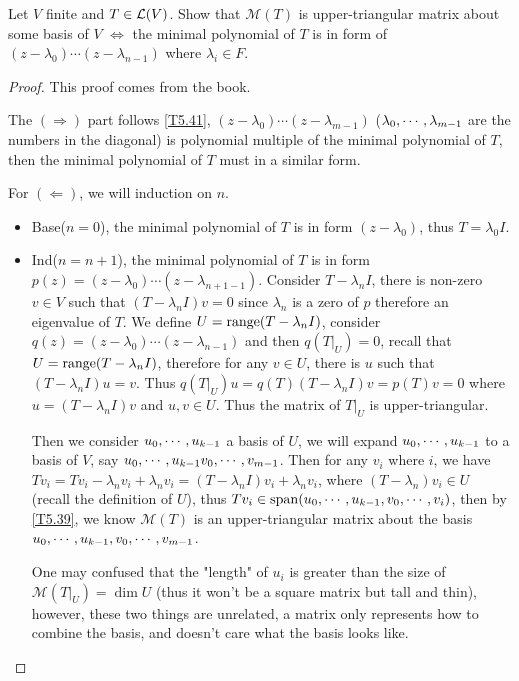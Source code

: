 \documentclass[../main.tex]{subfiles}
\begin{document}
\setcounter{theorem}{43}
\begin{theorem}
  Let $V$ finite and $T \in \mathcal{L}(V)$. Show that $\mathcal{M}(T)$ is upper-triangular matrix
  about some basis of $V$ $\iff$ the minimal polynomial of $T$ is in form of $(z - \lambda_0)\cdots(z - \lambda_{n - 1})$
  where $\lambda_i \in F$.
\end{theorem}
\begin{proof}
  This proof comes from the book.

  The $(\Rightarrow)$ part follows \ref{T5.41}, $(z - \lambda_0) \cdots (z - \lambda_{m - 1})$
  ($\lambda_0 , \cdots , \lambda_{m - 1}$ are the numbers in the diagonal) is polynomial multiple of 
  the minimal polynomial of $T$, then the minimal polynomial of $T$
  must in a similar form.

  For $(\Leftarrow)$, we will induction on $n$.
  \begin{itemize}
    \item Base($n = 0$), the minimal polynomial of $T$ is in form $(z - \lambda_0)$,
          thus $T = \lambda_0 I$.
    \item Ind($n = n + 1$), the minimal polynomial of $T$ is in form $p(z) = (z - \lambda_0) \cdots (z - \lambda_{n + 1 - 1})$.
          Consider $T - \lambda_nI$, there is non-zero $v \in V$ such that $(T - \lambda_nI)v = 0$
          since $\lambda_n$ is a zero of $p$ therefore an eigenvalue of $T$.
          We define $U = \operatorname{range} (T - \lambda_n I)$, consider $q(z) = (z - \lambda_0)\cdots(z - \lambda_{n - 1})$
          and then $q(T\big|_U) = 0$, recall that $U = \operatorname{range} (T - \lambda_n I)$, therefore for any $v \in U$, there is $u$ such that $(T - \lambda_nI)u = v$.
          Thus $q(T\big|_U)u = q(T)(T - \lambda_n I)v = p(T)v = 0$ where $u = (T - \lambda_n I) v$ and $u, v \in U$.
          Thus the matrix of $T\big|_U$ is upper-triangular.

          Then we consider $u_0 , \cdots , u_{k - 1}$ a basis of $U$, we will expand $u_0 , \cdots , u_{k - 1}$
          to a basis of $V$, say $u_0 , \cdots , u_{k - 1}v_0 , \cdots , v_{m - 1}$.
          Then for any $v_i$ where $i $, we have $Tv_i = Tv_i - \lambda_nv_i + \lambda_n v_i = (T - \lambda_n I)v_i + \lambda_n v_i$,
          where $(T - \lambda_n) v_i \in U$ (recall the definition of $U$),
          thus $Tv_i \in \operatorname{span}(u_0 , \cdots , u_{k - 1}, v_0 , \cdots , v_{i})$, then by \ref{T5.39},
          we know $\mathcal{M}(T)$ is an upper-triangular matrix about
          the basis $u_0 , \cdots , u_{k - 1}, v_0 , \cdots , v_{m - 1}$.

          One may confused that the "length" of $u_i$ is greater than the size of $\mathcal{M}(T\big|_U) = \dim U$
          (thus it won't be a square matrix but tall and thin),
          however, these two things are unrelated, a matrix only represents how to combine
          the basis, and doesn't care what the basis looks like.
  \end{itemize}
\end{proof}
\end{document}
